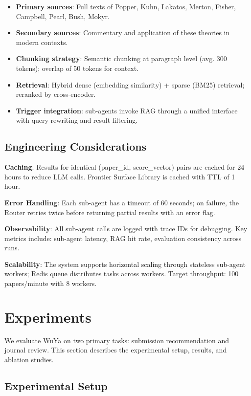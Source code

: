 \documentclass[11pt,a4paper]{article}
\newcommand{\subagent}{sub-agent}
\newcommand{\subagents}{sub-agents}
\begin{document}
\begin{itemize}
    \item \textbf{Primary sources}: Full texts of Popper, Kuhn, Lakatos, Merton, Fisher, Campbell, Pearl, Bush, Mokyr.
    \item \textbf{Secondary sources}: Commentary and application of these theories in modern contexts.
    \item \textbf{Chunking strategy}: Semantic chunking at paragraph level (avg. 300 tokens); overlap of 50 tokens for context.
    \item \textbf{Retrieval}: Hybrid dense (embedding similarity) + sparse (BM25) retrieval; reranked by cross-encoder.
    \item \textbf{Trigger integration}: \subagents{} invoke RAG through a unified interface with query rewriting and result filtering.
\end{itemize}

\subsection{Engineering Considerations}

\textbf{Caching}: Results for identical (paper\_id, score\_vector) pairs are cached for 24 hours to reduce LLM calls. Frontier Surface Library is cached with TTL of 1 hour.

\textbf{Error Handling}: Each \subagent{} has a timeout of 60 seconds; on failure, the Router retries twice before returning partial results with an error flag.

\textbf{Observability}: All \subagent{} calls are logged with trace IDs for debugging. Key metrics include: \subagent{} latency, RAG hit rate, evaluation consistency across runs.

\textbf{Scalability}: The system supports horizontal scaling through stateless \subagent{} workers; Redis queue distributes tasks across workers. Target throughput: 100 papers/minute with 8 workers.

\section{Experiments}
\label{sec:experiments}

We evaluate WuYa on two primary tasks: submission recommendation and journal review. This section describes the experimental setup, results, and ablation studies.

\subsection{Experimental Setup}
\end{document}
